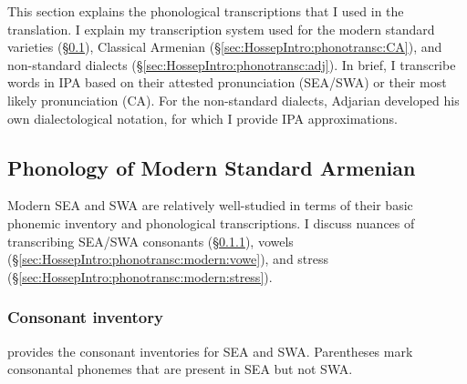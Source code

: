 \documentclass[output=paper]{langscibook}
\begin{document}
This section explains the phonological transcriptions that I used in the translation. I explain my transcription system used for the modern standard varieties (\S\ref{sec:HossepIntro:phonotransc:modern}), Classical Armenian (\S\ref{sec:HossepIntro:phonotransc:CA}),  and non-standard dialects (\S\ref{sec:HossepIntro:phonotransc:adj}). In brief, I transcribe words in IPA based on their attested pronunciation (SEA/SWA)  or their most likely pronunciation (CA). For the non-standard dialects, Adjarian developed his own dialectological notation, for which I provide IPA approximations. 
\subsection{Phonology of Modern Standard Armenian}\label{sec:HossepIntro:phonotransc:modern}

Modern SEA and SWA are relatively well-studied in terms of their basic phonemic inventory and phonological transcriptions. I discuss nuances of transcribing SEA/SWA consonants (\S\ref{sec:HossepIntro:phonotransc:modern:cons}), vowels (\S\ref{sec:HossepIntro:phonotransc:modern:vowe}),  and stress (\S\ref{sec:HossepIntro:phonotransc:modern:stress}). 
\subsubsection{Consonant inventory}\label{sec:HossepIntro:phonotransc:modern:cons}
 provides the consonant inventories for SEA and SWA. Parentheses mark consonantal phonemes that are present in SEA but not SWA. 

\begin{table}
	\caption{Consonant inventory of SEA and SWA}\label{fig:HossepIntro:consSEA}
\end{table}
\end{document}
